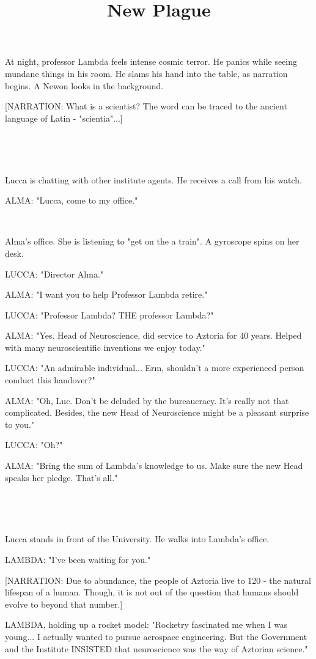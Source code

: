 \documentclass[11pt]{article}
\begin{document}
\ttfamily
\title{New Plague}
\maketitle

At night, professor Lambda feels intense cosmic terror. He panics while seeing mundane things in his room. He slams his hand into the table, as narration begins.
A Newon looks in the background.

[NARRATION: What is a scientist?
The word can be traced to the ancient language of Latin - "scientia"...]

\ 

\ 

Lucca is chatting with other institute agents.
He receives a call from his watch.

ALMA: "Lucca, come to my office."

\ 

Alma's office.
She is listening to "get on the a train".
A gyroscope spins on her desk.

LUCCA: "Director Alma."

ALMA: "I want you to help Professor Lambda retire."

LUCCA: "Professor Lambda? THE professor Lambda?"

ALMA: "Yes. Head of Neuroscience, did service to Aztoria for 40 years.
Helped with many neuroscientific inventions we enjoy today."

LUCCA: "An admirable individual...
Erm, shouldn't a more experienced person conduct this handover?"

ALMA: "Oh, Luc. 
Don't be deluded by the bureaucracy.
It's really not that complicated.
Besides, the new Head of Neuroscience might be a pleasant surprise to you."

LUCCA: "Oh?"

ALMA: "Bring the sum of Lambda's knowledge to us.
Make sure the new Head speaks her pledge.
That's all."

\ 

\ 

Lucca stands in front of the University.
He walks into Lambda's office.

LAMBDA: "I've been waiting for you."

[NARRATION: Due to abundance, the people of Aztoria live to 120 - the natural lifespan of a human.
Though, it is not out of the question that humans should evolve to beyond that number.]

LAMBDA, holding up a rocket model: "Rocketry fascinated me when I was young...
I actually wanted to pursue aerospace engineering.
But the Government and the Institute INSISTED that neuroscience was the way of Aztorian science."
\end{document}
